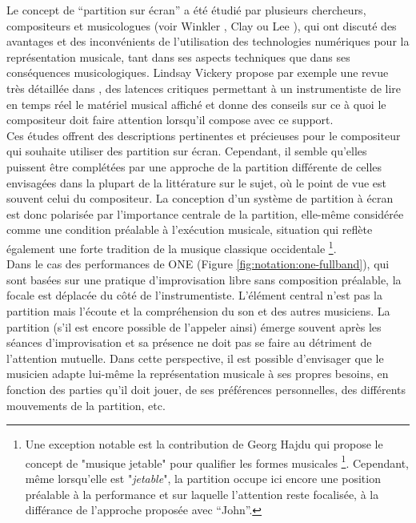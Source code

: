\indent Le concept de ``partition sur écran'' a été étudié par plusieurs chercheurs, compositeurs et musicologues (voir Winkler \cite{winkler_real-time_2004}, Clay \cite{adams_inventing_2008} ou Lee \cite{lee_real-time_2012}), qui ont discuté des avantages et des inconvénients de l'utilisation des technologies numériques pour la représentation musicale, tant dans ses aspects techniques que dans ses conséquences musicologiques. Lindsay Vickery propose par exemple une revue très détaillée dans \cite{vickery_limitations_2014}, des latences critiques permettant à un instrumentiste de lire en temps réel le matériel musical affiché et donne des conseils sur ce à quoi le compositeur doit faire attention lorsqu'il compose avec ce support.\\
\indent Ces études offrent des descriptions pertinentes et précieuses pour le compositeur qui souhaite utiliser des partition sur écran. Cependant, il semble qu'elles puissent être complétées par une approche de la partition différente de celles envisagées dans la plupart de la littérature sur le sujet, où le point de vue est souvent celui du compositeur. La conception d'un système de partition à écran est donc polarisée par l'importance centrale de la partition, elle-même considérée comme une condition préalable à l'exécution musicale, situation qui reflète également une forte tradition de la musique classique occidentale \footnote{Une exception notable est la contribution de Georg Hajdu \cite{hajdu_disposable_2016} qui propose le concept de "musique jetable" pour qualifier les formes musicales \footnote{}. Cependant, même lorsqu'elle est "\textit{jetable}", la partition occupe ici encore une position préalable à la performance et sur laquelle l'attention reste focalisée, à la différance de l'approche proposée avec ``John''.}.\\
\indent Dans le cas des performances de ONE (Figure \ref{fig:notation:one-fullband}), qui sont basées sur une pratique d'improvisation libre sans composition préalable, la focale est déplacée du côté de l'instrumentiste. L'élément central n'est pas la partition mais l'écoute et la compréhension du son et des autres musiciens. La partition (s'il est encore possible de l'appeler ainsi) émerge souvent après les séances d'improvisation et sa présence ne doit pas se faire au détriment de l'attention mutuelle. Dans cette perspective, il est possible d'envisager que le musicien adapte lui-même la représentation musicale à ses propres besoins, en fonction des parties qu'il doit jouer, de ses préférences personnelles, des différents mouvements de la partition, etc.\\

